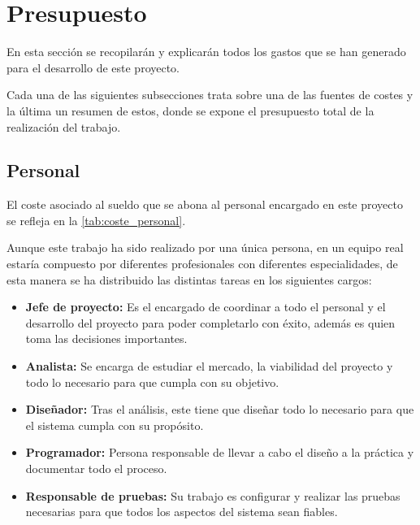 \section{Presupuesto}\label{sec:presupuesto}
En esta sección se recopilarán y explicarán todos los gastos que se han generado para el desarrollo de este proyecto.

Cada una de las siguientes subsecciones trata sobre una de las fuentes de costes y la última un resumen de estos, donde se expone el presupuesto total de la realización del trabajo.

\subsection{Personal}\label{subsec:personal}
El coste asociado al sueldo que se abona al personal encargado en este proyecto se refleja en la \autoref{tab:coste_personal}.

Aunque este trabajo ha sido realizado por una única persona, en un equipo real estaría compuesto por diferentes profesionales con diferentes especialidades, de esta manera se ha distribuido las distintas tareas en los siguientes cargos:
\begin{itemize}
	\item \textbf{Jefe de proyecto:} Es el encargado de coordinar a todo el personal y el desarrollo del proyecto para poder completarlo con éxito, además es quien toma las decisiones importantes.
	\item \textbf{Analista:} Se encarga de estudiar el mercado, la viabilidad del proyecto y todo lo necesario para que cumpla con su objetivo.
	\item \textbf{Diseñador:} Tras el análisis, este tiene que diseñar todo lo necesario para que el sistema cumpla con su propósito.
	\item \textbf{Programador:} Persona responsable de llevar a cabo el diseño a la práctica y documentar todo el proceso.
	\item \textbf{Responsable de pruebas:} Su trabajo es configurar y realizar las pruebas necesarias para que todos los aspectos del sistema sean fiables.
\end{itemize}

